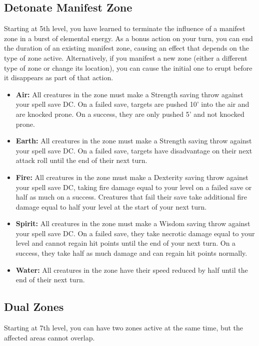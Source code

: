 \subsection{Detonate Manifest Zone}
Starting at 5th level, you have learned to terminate the influence of a manifest zone in a burst of elemental energy. As a bonus action on your turn, you can end the duration of an existing manifest zone, causing an effect that depends on the type of zone active. Alternatively, if you manifest a new zone (either a different type of zone or change its location), you can cause the initial one to erupt before it disappears as part of that action.
\begin{itemize}
	\item \textbf{Air:} All creatures in the zone must make a Strength saving throw against your spell save DC. On a failed save, targets are pushed 10' into the air and are knocked prone. On a success, they are only pushed 5' and not knocked prone.
	\item \textbf{Earth:} All creatures in the zone must make a Strength saving throw against your spell save DC. On a failed save, targets have disadvantage on their next attack roll until the end of their next turn.
	\item \textbf{Fire:} All creatures in the zone must make a Dexterity saving throw against your spell save DC, taking fire damage equal to your level on a failed save or half as much on a success. Creatures that fail their save take additional fire damage equal to half your level at the start of your next turn.
	\item \textbf{Spirit:} All creatures in the zone must make a Wisdom saving throw against your spell save DC. On a failed save, they take necrotic damage equal to your level and cannot regain hit points until the end of your next turn. On a success, they take half as much damage and can regain hit points normally.
	\item \textbf{Water:} All creatures in the zone have their speed reduced by half until the end of their next turn.
\end{itemize}

\subsection{Dual Zones}
Starting at 7th level, you can have two zones active at the same time, but the affected areas cannot overlap.

